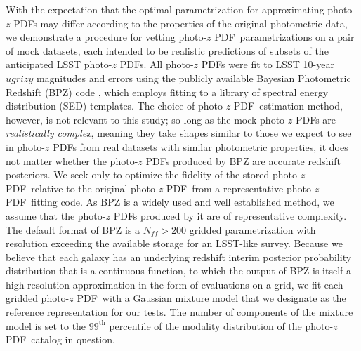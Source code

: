 \documentclass[\docopts]{\docclass}
\newcommand{\pz}{photo-$z$ PDF}
\begin{document}
With the expectation that the optimal parametrization for approximating \pz s 
may differ according to the properties of the original photometric data, we 
demonstrate a procedure for vetting \pz\ parametrizations on a pair of mock 
datasets, each intended to be realistic predictions of subsets of the 
anticipated LSST \pz s.
All \pz s were fit to LSST 10-year $ugrizy$ magnitudes and errors 
\citep{ivezic_lsst:_2008} using the publicly available Bayesian Photometric 
Redshift (BPZ) code \citep{benitez_bayesian_2000}, which employs fitting to a 
library of spectral energy distribution (SED) templates.
The choice of \pz\ estimation method, however, is not relevant to this study; 
so long as the mock \pz s are \textit{realistically complex}, meaning they take 
shapes similar to those we expect to see in \pz s from real datasets with 
similar photometric properties, it does not matter whether the \pz s produced 
by BPZ are accurate redshift posteriors.
We seek only to optimize the fidelity of the stored \pz\ relative to the 
original \pz\ from a representative \pz\ fitting code.
\citep[See][Schmidt, et al.\ in preparation for other work comparing the 
accuracy of \pz s produced by different methods.]{tanaka_photometric_2017, 
jong_third_2017, amaro_metaphor:_2016}
As BPZ is a widely used and well established method, we assume that the \pz s 
produced by it are of representative complexity.
The default format of BPZ is a $N_{ff}>200$ gridded parametrization with 
resolution exceeding the available storage for an LSST-like survey.
Because we believe that each galaxy has an underlying redshift interim 
posterior probability distribution that is a continuous function, to which the 
output of BPZ is itself a high-resolution approximation in the form of 
evaluations on a grid, we fit each gridded \pz\ with a Gaussian mixture model 
that we designate as the reference representation for our tests.
The number of components of the mixture model is set to the $99^{\mathrm{th}}$ 
percentile of the modality distribution of the \pz\ catalog in question.
\end{document}
